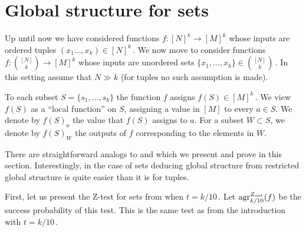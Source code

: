 \documentclass[11pt]{article}
\numberwithin{equation}{section}
\theoremstyle{definition}
\theoremstyle{plain}
\newcommand{\set}[1]{\{#1\}} %
\newcommand\setf{f} %
\newcommand{\test}[2]{
	\ifx &#2&
	\textrm{agr}^{#1}
	\else	
	\textrm{agr}^{#1}_{#2}
	\fi}
\begin{document}
\section{Global structure for sets}\label{sec:sets}
Up until now we have considered functions $f:[N]^k\to[M]^k$ whose inputs are ordered tuples $(x_1\ldots,x_k)\in [N]^k$\,. We now move to consider functions $f:\binom {[N]} k \to[M]^k$ whose inputs are unordered sets $\set{x_1,\ldots,x_k} \in \binom{[N]}k$\,. In this setting assume that $N\gg k$ (for tuples no such assumption is made).


To each subset $S=\set{s_1,\ldots,s_k} $ the function $f$ assigns $f(S)\in [M]^k$\,. We view $f(S)$ as a ``local function'' on $S$, assigning a value in $[M]$ to every $a\in S$. We denote by $\setf(S)_a$ the value that $\setf(S)$ assigns to $a$. For a subset $W\subset S$, we denote by $\setf(S)_W$ the outputs of $\setf$ corresponding to the elements in $W$.

There are straightforward analogs to  and  which we present and prove in this section. Interestingly, in the case of sets deducing global structure from restricted global structure is quite easier than it is for tuples.

First, let us present the %
Z-test %
for sets from \cite{impagliazzo2012new} when $t=k/10$\,. Let $\test{Z_{set}}{k/10}(\setf)$ be the success probability of this test. This is the same test as  from the introduction with $t=k/10$\,.
\end{document}
